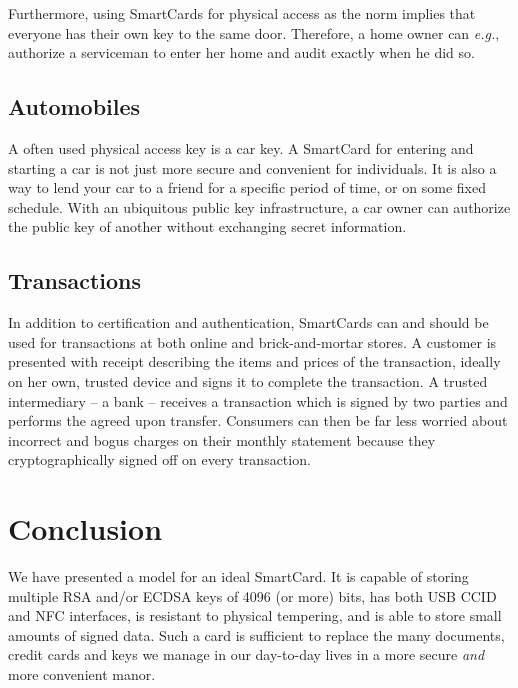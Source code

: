 \documentclass[11pt, twocolumn]{article}
\begin{document}
Furthermore, using SmartCards for physical access as the norm implies that
everyone has their own key to the same door. Therefore, a home owner can
\textit{e.g.}, authorize a serviceman to enter her home and audit exactly when
he did so.

\subsection{Automobiles}

A often used physical access key is a car key. A SmartCard for entering and
starting a car is not just more secure and convenient for individuals. It is
also a way to lend your car to a friend for a specific period of time, or on
some fixed schedule. With an ubiquitous public key infrastructure, a car owner
can authorize the public key of another without exchanging secret information.

\subsection{Transactions}

In addition to certification and authentication, SmartCards can and should be
used for transactions at both online and brick-and-mortar stores. A customer is
presented with receipt describing the items and prices of the transaction,
ideally on her own, trusted device and signs it to complete the transaction. A
trusted intermediary -- a bank -- receives a transaction which is signed by two
parties and performs the agreed upon transfer. Consumers can then be far less
worried about incorrect and bogus charges on their monthly statement because
they cryptographically signed off on every transaction.

\section{Conclusion}
\label{sec:conclusion}

We have presented a model for an ideal SmartCard. It is capable of storing
multiple RSA and/or ECDSA keys of 4096 (or more) bits, has both USB CCID and
NFC interfaces, is resistant to physical tempering, and is able to store small
amounts of signed data. Such a card is sufficient to replace the many documents,
credit cards and keys we manage in our day-to-day lives in a more secure
\textit{and} more convenient manor.



\end{document}
